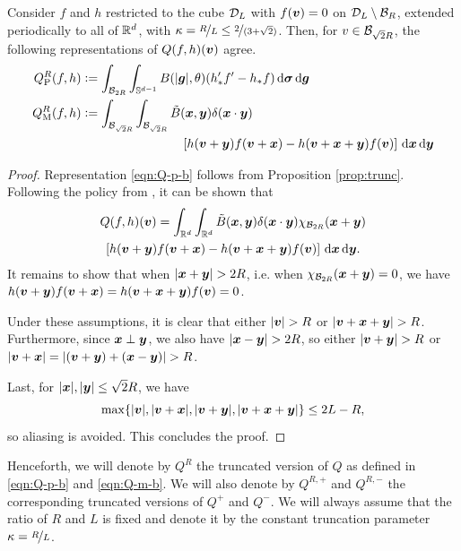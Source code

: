 \begin{proposition} \label{prop:equiv}
Consider $f$ and $h$ restricted to the cube $\mathcal{D}_L$ with $f({\bm v})=0$ on
$\mathcal{D}_L\setminus\mathcal{B}_R$, extended periodically to all of $\mathbb{R}^d$, with
$\kappa=\nicefrac{R}{L}\leq\nicefrac{2}{(3+\sqrt{2})}$. Then, for $v\in\mathcal{B}_{\sqrt{2}R}$, the
following representations of $Q(f,h)({\bm v})$ agree.
\begin{align}
    \label{eqn:Q-p-b}
    Q^R_{\mathrm{P}}(f,h) &\vcentcolon= 
    \int_{\mathcal{B}_{2R}}\int_{\mathbb{S}^{d-1}} B(|{\bm g}|,\theta)(h_*'f'-h_*f)\,\mathrm{d}{\bm\sigma} \,\mathrm{d} {\bm g} \\
    \label{eqn:Q-m-b} 
    Q^R_{\mathrm{M}}(f,h) &\vcentcolon= \int_{\mathcal{B}_{\sqrt{2}R}}\int_{\mathcal{B}_{\sqrt{2}R}} \tilde{B}({\bm x},{\bm y})\delta({\bm x}\cdot {\bm y}) \\
    \nonumber & \qquad\qquad\qquad\qquad
        \left[ h({\bm v}+{\bm y})f({\bm v}+{\bm x}) - h({\bm v}+{\bm x}+{\bm y})f({\bm v}) \right] \,\mathrm{d} {\bm x} \,\mathrm{d} {\bm y}
\end{align}
\end{proposition}
\begin{proof}
Representation \eqref{eqn:Q-p-b} follows from Proposition \ref{prop:trunc}.
Following the policy from \cite{Mouhot2006fac}, it can be shown that
\begin{multline*}
    Q(f,h)({\bm v}) = \int_{\mathbb{R}^d}\int_{\mathbb{R}^d}\tilde{B}({\bm x},{\bm y})\delta({\bm x}\cdot {\bm y})\chi_{\mathcal{B}_{2R}}({\bm x}+{\bm y})  \\ 
    \left[h({\bm v}+{\bm y})f({\bm v}+{\bm x})-h({\bm v}+{\bm x}+{\bm y})f({\bm v})\right] \,\mathrm{d} {\bm x} \,\mathrm{d} {\bm y}. 
\end{multline*}
It remains to show that when $|\Bx+\By|>2R$, i.e. when
$\chi_{\mathcal{B}_{2R}}({\bm x}+{\bm y})=0$, we have $h({\bm v}+{\bm y})f({\bm v}+{\bm x}) = h({\bm v}+{\bm x}+{\bm y})f({\bm v})
= 0$.

Under these assumptions, it is clear that either $|\Bv|>R$ or
$|\Bv+\Bx+\By|>R$. Furthermore, since ${\bm x}\perp {\bm y}$, we also have
$|\Bx-\By|>2R$, so either $|\Bv+\By|>R$ or $|{\bm v}+{\bm x}| =
|({\bm v}+{\bm y})+({\bm x}-{\bm y})| > R$.

Last, for $|{\bm x}|,|{\bm y}|\leq\sqrt{2}R$, we have
\[
    \max\{|{\bm v}|,|{\bm v}+{\bm x}|,|{\bm v}+{\bm y}|,|{\bm v}+{\bm x}+{\bm y}|\} \leq 2L-R,
\]
so aliasing is avoided. This concludes the proof.
\end{proof}

Henceforth, we will denote by $Q^R$ the truncated version of $Q$ as defined in \eqref{eqn:Q-p-b} and
\eqref{eqn:Q-m-b}. We will also denote by $Q^{R,+}$ and $Q^{R,-}$ the corresponding truncated versions of
$Q^+$ and $Q^-$. We will always assume that the ratio of $R$ and $L$ is fixed and denote it by the constant
truncation parameter $\kappa=\nicefrac{R}{L}$.

